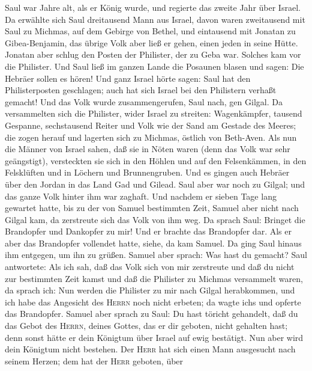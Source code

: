  Saul war Jahre alt, als er König wurde, und regierte das
zweite Jahr über Israel.  Da erwählte sich Saul
dreitausend Mann aus Israel, davon waren zweitausend mit Saul zu
Michmas, auf dem Gebirge von Bethel, und eintausend mit Jonatan zu
Gibea-Benjamin, das übrige Volk aber ließ er gehen, einen jeden in seine
Hütte.  Jonatan aber schlug den Posten der Philister, der
zu Geba war. Solches kam vor die Philister. Und Saul ließ im ganzen
Lande die Posaunen blasen und sagen: Die Hebräer sollen es hören!
 Und ganz Israel hörte sagen: Saul hat den Philisterposten
geschlagen; auch hat sich Israel bei den Philistern verhaßt gemacht! Und
das Volk wurde zusammengerufen, Saul nach, gen Gilgal.  Da
versammelten sich die Philister, wider Israel zu streiten: Wagenkämpfer,
tausend Gespanne, sechstausend Reiter und Volk wie der Sand am Gestade
des Meeres; die zogen herauf und lagerten sich zu Michmas, östlich von
Beth-Aven.  Als nun die Männer von Israel sahen, daß sie
in Nöten waren (denn das Volk war sehr geängstigt), versteckten sie sich
in den Höhlen und auf den Felsenkämmen, in den Felsklüften und in
Löchern und Brunnengruben.  Und es gingen auch Hebräer
über den Jordan in das Land Gad und Gilead. Saul aber war noch zu
Gilgal; und das ganze Volk hinter ihm war zaghaft.  Und
nachdem er sieben Tage lang gewartet hatte, bis zu der von Samuel
bestimmten Zeit, Samuel aber nicht nach Gilgal kam, da zerstreute sich
das Volk von ihm weg.  Da sprach Saul: Bringet die
Brandopfer und Dankopfer zu mir! Und er brachte das Brandopfer dar.
 Als er aber das Brandopfer vollendet hatte, siehe, da
kam Samuel. Da ging Saul hinaus ihm entgegen, um ihn zu grüßen.
 Samuel aber sprach: Was hast du gemacht? Saul
antwortete: Als ich sah, daß das Volk sich von mir zerstreute und daß du
nicht zur bestimmten Zeit kamst und daß die Philister zu Michmas
versammelt waren,  da sprach ich: Nun werden die
Philister zu mir nach Gilgal herabkommen, und ich habe das Angesicht des
\textsc{Herrn} noch nicht erbeten; da wagte ich\textquotesingle s und
opferte das Brandopfer.  Samuel aber sprach zu Saul: Du
hast töricht gehandelt, daß du das Gebot des \textsc{Herrn}, deines
Gottes, das er dir geboten, nicht gehalten hast; denn sonst hätte er
dein Königtum über Israel auf ewig bestätigt.  Nun aber
wird dein Königtum nicht bestehen. Der \textsc{Herr} hat sich einen Mann
ausgesucht nach seinem Herzen; dem hat der \textsc{Herr} geboten, über
